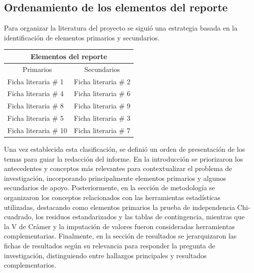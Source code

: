 \documentclass[12pt]{article}
\begin{document}
\subsection{Ordenamiento de los elementos del reporte}

Para organizar la literatura del proyecto se siguió una estrategia basada 
en la identificación de elementos primarios y secundarios. 

\begin{table}[H]
\centering
\begin{tabular}{ll}
\hline
\multicolumn{2}{c}{Elementos del reporte}                       \\ \hline
\multicolumn{1}{c}{Primarios} & \multicolumn{1}{c}{Secundarios} \\ \hline
Ficha literaria \# 1          & Ficha literaria \# 2            \\ \hline
Ficha literaria \# 4          & Ficha literaria \# 6            \\ \hline
Ficha literaria \# 8          & Ficha literaria \# 9            \\ \hline
Ficha literaria \# 5          & Ficha literaria \# 3            \\ \hline
Ficha literaria \# 10         & Ficha literaria \# 7            \\ \hline
\end{tabular}
\end{table}

Una vez establecida esta clasificación, se definió un orden de presentación de los 
temas para guiar la redacción del informe. En la introducción se priorizaron los 
antecedentes y conceptos más relevantes para contextualizar el problema de investigación,
incorporando principalmente elementos primarios y algunos secundarios de apoyo. 
Posteriormente, en la sección de metodología se organizaron los conceptos relacionados 
con las herramientas estadísticas utilizadas, destacando como elementos primarios 
la prueba de independencia Chi-cuadrado, los residuos estandarizados y las tablas 
de contingencia, mientras que la V de Crámer y la imputación de valores fueron 
consideradas herramientas complementarias. Finalmente, en la sección de resultados 
se jerarquizaron las fichas de resultados según su relevancia para responder la 
pregunta de investigación, distinguiendo entre hallazgos principales y resultados complementarios.
\end{document}
